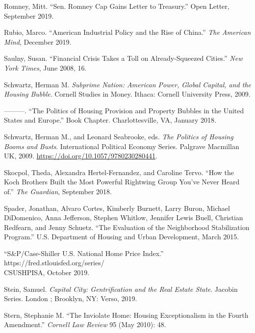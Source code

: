 \documentclass[12pt,oneside]{psthesis}
\begin{document}
\leavevmode\hypertarget{ref-romney2019sen}{}%
Romney, Mitt. ``Sen. Romney Cap Gains Letter to Treasury.'' Open Letter, September 2019.

\leavevmode\hypertarget{ref-rubio2019american}{}%
Rubio, Marco. ``American Industrial Policy and the Rise of China.'' \emph{The American Mind}, December 2019.

\leavevmode\hypertarget{ref-saulny2008financial}{}%
Saulny, Susan. ``Financial Crisis Takes a Toll on Already-Squeezed Cities.'' \emph{New York Times}, June 2008, 16.

\leavevmode\hypertarget{ref-schwartz2009subprime}{}%
Schwartz, Herman M. \emph{Subprime Nation: American Power, Global Capital, and the Housing Bubble}. Cornell Studies in Money. Ithaca: Cornell University Press, 2009.

\leavevmode\hypertarget{ref-schwartz2018politics}{}%
---------. ``The Politics of Housing Provision and Property Bubbles in the United States and Europe.'' Book Chapter. Charlottesville, VA, January 2018.

\leavevmode\hypertarget{ref-schwartz2009politics}{}%
Schwartz, Herman M., and Leonard Seabrooke, eds. \emph{The Politics of Housing Booms and Busts}. International Political Economy Series. Palgrave Macmillan UK, 2009. \url{https://doi.org/10.1057/9780230280441}.

\leavevmode\hypertarget{ref-skocpol2018how}{}%
Skocpol, Theda, Alexandra Hertel-Fernandez, and Caroline Tervo. ``How the Koch Brothers Built the Most Powerful Rightwing Group You've Never Heard of.'' \emph{The Guardian}, September 2018.

\leavevmode\hypertarget{ref-spader2015evaluation}{}%
Spader, Jonathan, Alvaro Cortes, Kimberly Burnett, Larry Buron, Michael DiDomenico, Anna Jefferson, Stephen Whitlow, Jennifer Lewis Buell, Christian Redfearn, and Jenny Schuetz. ``The Evaluation of the Neighborhood Stabilization Program.'' U.S. Department of Housing and Urban Development, March 2015.

\leavevmode\hypertarget{ref-2019caseshiller}{}%
``S\&P/Case-Shiller U.S. National Home Price Index.'' https://fred.stlouisfed.org/series/\\CSUSHPISA, October 2019.

\leavevmode\hypertarget{ref-stein2019capital}{}%
Stein, Samuel. \emph{Capital City: Gentrification and the Real Estate State}. Jacobin Series. London ; Brooklyn, NY: Verso, 2019.

\leavevmode\hypertarget{ref-stern2010inviolate}{}%
Stern, Stephanie M. ``The Inviolate Home: Housing Exceptionalism in the Fourth Amendment.'' \emph{Cornell Law Review} 95 (May 2010): 48.
\end{document}
